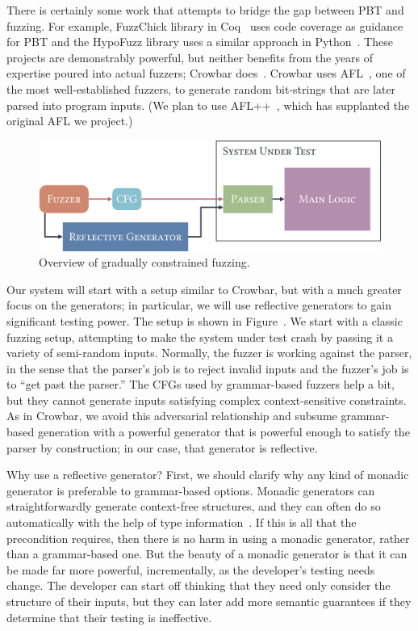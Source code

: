 There is certainly some work that attempts to bridge the gap between PBT and
fuzzing. For example, FuzzChick library in Coq~\cite{OLDlampropoulos19fuzzchick}
uses code coverage as guidance for PBT and the HypoFuzz library uses a
similar approach in Python~\cite{hatfield-dodds_hypofuzz_nodate}. These projects
are demonstrably powerful, but neither benefits from the years of expertise
poured into actual fuzzers; Crowbar does~\cite{dolan2017testing}. Crowbar uses
AFL~\cite{afl-readme}, one of the most well-established
fuzzers, to generate random bit-strings that are later parsed into program
inputs.  (We plan to use AFL++~\cite{fioraldi_afl_2020},
which has supplanted the original AFL we project.)

\begin{figure}
  \centering
  \includegraphics[width=.4\textwidth]{assets/fuzzing.pdf}
  \caption{Overview of gradually constrained fuzzing.}\label{fig:fuzzing-plan}
\end{figure}

Our system will start with a setup similar to Crowbar, but with a much greater
focus on the generators; in particular, we will use reflective generators to
gain significant testing power. The setup is shown in
Figure~. We start with a classic fuzzing setup, attempting
to make the system under test crash by passing it a variety of semi-random
inputs. Normally, the fuzzer is working against the parser, in the sense that
the parser's job is to reject invalid inputs and the fuzzer's job is to ``get
past the parser.'' The CFGs used by grammar-based fuzzers help a bit, but they
cannot generate inputs satisfying complex context-sensitive constraints. As in
Crowbar, we avoid this adversarial relationship and subsume grammar-based
generation with a powerful generator that is powerful enough to satisfy the
parser by construction; in our case, that generator is reflective.

Why use a reflective generator? First, we should clarify why any kind of monadic
generator is preferable to grammar-based options. Monadic generators can
straightforwardly generate context-free structures, and they can often do so
automatically with the help of type information~\cite{mista2019deriving}. If
this is all that the precondition requires, then there is no harm in using a
monadic generator, rather than a grammar-based one. But the beauty of a monadic
generator is that it can be made far more powerful, incrementally, as the
developer's testing needs change. The developer can start off thinking that they
need only consider the structure of their inputs, but they can later add more
semantic guarantees if they determine that their testing is ineffective.

